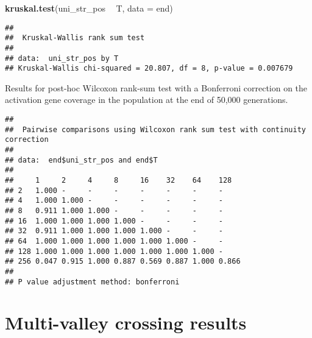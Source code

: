 \documentclass[]{book}
\newenvironment{Shaded}{\begin{snugshade}}{\end{snugshade}}
\newcommand{\DataTypeTok}[1]{\textcolor[rgb]{0.13,0.29,0.53}{#1}}
\newcommand{\KeywordTok}[1]{\textcolor[rgb]{0.13,0.29,0.53}{\textbf{#1}}}
\newcommand{\NormalTok}[1]{#1}
\newcommand{\OperatorTok}[1]{\textcolor[rgb]{0.81,0.36,0.00}{\textbf{#1}}}
\newcommand{\OtherTok}[1]{\textcolor[rgb]{0.56,0.35,0.01}{#1}}
\newcommand{\StringTok}[1]{\textcolor[rgb]{0.31,0.60,0.02}{#1}}
\begin{document}
\begin{Shaded}
\begin{Highlighting}[]
\KeywordTok{kruskal.test}\NormalTok{(uni_str_pos }\OperatorTok{~}\StringTok{ }\NormalTok{T, }\DataTypeTok{data =}\NormalTok{ end)}
\end{Highlighting}
\end{Shaded}

\begin{verbatim}
## 
##  Kruskal-Wallis rank sum test
## 
## data:  uni_str_pos by T
## Kruskal-Wallis chi-squared = 20.807, df = 8, p-value = 0.007679
\end{verbatim}

Results for post-hoc Wilcoxon rank-sum test with a Bonferroni correction on the activation gene coverage in the population at the end of 50,000 generations.

\begin{Shaded}
\end{Shaded}

\begin{verbatim}
## 
##  Pairwise comparisons using Wilcoxon rank sum test with continuity correction 
## 
## data:  end$uni_str_pos and end$T 
## 
##     1     2     4     8     16    32    64    128  
## 2   1.000 -     -     -     -     -     -     -    
## 4   1.000 1.000 -     -     -     -     -     -    
## 8   0.911 1.000 1.000 -     -     -     -     -    
## 16  1.000 1.000 1.000 1.000 -     -     -     -    
## 32  0.911 1.000 1.000 1.000 1.000 -     -     -    
## 64  1.000 1.000 1.000 1.000 1.000 1.000 -     -    
## 128 1.000 1.000 1.000 1.000 1.000 1.000 1.000 -    
## 256 0.047 0.915 1.000 0.887 0.569 0.887 1.000 0.866
## 
## P value adjustment method: bonferroni
\end{verbatim}

\hypertarget{multi-valley-crossing-results-1}{%
\section{Multi-valley crossing results}\label{multi-valley-crossing-results-1}}
\end{document}
